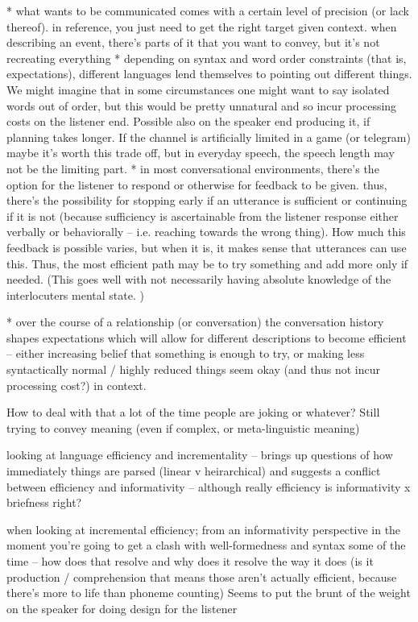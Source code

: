 \documentclass[]{article}
\begin{document}
* what wants to be communicated comes with a certain level of precision (or lack thereof). in reference, you just need to get the right target given context. when describing an event, there's parts of it that you want to convey, but it's not recreating everything
* depending on syntax and word order constraints (that is, expectations), different languages lend themselves to pointing out different things. We might imagine that in some circumstances one might want to say isolated words out of order, but this would be pretty unnatural and so incur processing costs on the listener end. Possible also on the speaker end producing it, if planning takes longer. If the channel is artificially limited in a game (or telegram) maybe it's worth this trade off, but in everyday speech, the speech length may not be the limiting part. 
* in most conversational environments, there's the option for the listener to respond or otherwise for feedback to be given. thus, there's the possibility for stopping early if an utterance is sufficient or continuing if it is not (because sufficiency is ascertainable from the listener response either verbally or behaviorally -- i.e. reaching towards the wrong thing). How much this feedback is possible varies, but when it is, it makes sense that utterances can use this. Thus, the most efficient path may be to try something and add more only if needed. (This goes well with not necessarily having absolute knowledge of the interlocuters mental state. )

* over the course of a relationship (or conversation) the conversation history shapes expectations which will allow for different descriptions to become efficient -- either increasing belief that something is enough to try, or making less syntactically normal / highly reduced things seem okay (and thus not incur processing cost?) in context. 

How to deal with that a lot of the time people are joking or whatever? Still trying to convey meaning (even if complex, or meta-linguistic meaning)


\cite{rubio-fernandez2021} looking at language efficiency and incrementality -- brings up questions of how immediately things are parsed (linear v heirarchical) and suggests a conflict between efficiency and informativity -- although really efficiency is informativity x briefness right? 

\cite{rubio-fernandez2021} when looking at incremental efficiency; from an informativity perspective in the moment you're going to get a clash with well-formedness and syntax some of the time -- how does that resolve and why does it resolve the way it does (is it production / comprehension that means those aren't actually efficient, because there's more to life than phoneme counting) Seems to put the brunt of the weight on the speaker for doing design for the listener 
\end{document}
